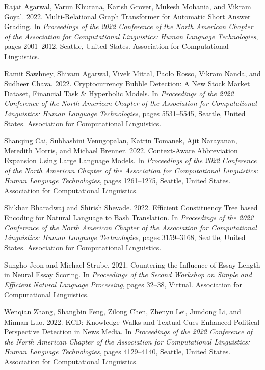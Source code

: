 \documentclass[11pt]{article}
\begin{document}
\begin{thebibliography}{50}
\bibitem{}
Rajat Agarwal, Varun Khurana, Karish Grover, Mukesh Mohania, and Vikram Goyal. 2022. Multi-Relational Graph Transformer for Automatic Short Answer Grading. In \emph{Proceedings of the 2022 Conference of the North American Chapter of the Association for Computational Linguistics: Human Language Technologies}, pages 2001–2012, Seattle, United States. Association for Computational Linguistics.

\bibitem{}
Ramit Sawhney, Shivam Agarwal, Vivek Mittal, Paolo Rosso, Vikram Nanda, and Sudheer Chava. 2022. Cryptocurrency Bubble Detection: A New Stock Market Dataset, Financial Task \& Hyperbolic Models. In \emph{Proceedings of the 2022 Conference of the North American Chapter of the Association for Computational Linguistics: Human Language Technologies}, pages 5531–5545, Seattle, United States. Association for Computational Linguistics.

\bibitem{}
Shanqing Cai, Subhashini Venugopalan, Katrin Tomanek, Ajit Narayanan, Meredith Morris, and Michael Brenner. 2022. Context-Aware Abbreviation Expansion Using Large Language Models. In \emph{Proceedings of the 2022 Conference of the North American Chapter of the Association for Computational Linguistics: Human Language Technologies}, pages 1261–1275, Seattle, United States. Association for Computational Linguistics.

\bibitem{}
Shikhar Bharadwaj and Shirish Shevade. 2022. Efficient Constituency Tree based Encoding for Natural Language to Bash Translation. In \emph{Proceedings of the 2022 Conference of the North American Chapter of the Association for Computational Linguistics: Human Language Technologies}, pages 3159–3168, Seattle, United States. Association for Computational Linguistics.

\bibitem{}
Sungho Jeon and Michael Strube. 2021. Countering the Influence of Essay Length in Neural Essay Scoring. In \emph{Proceedings of the Second Workshop on Simple and Efficient Natural Language Processing}, pages 32–38, Virtual. Association for Computational Linguistics.

\bibitem{}
Wenqian Zhang, Shangbin Feng, Zilong Chen, Zhenyu Lei, Jundong Li, and Minnan Luo. 2022. KCD: Knowledge Walks and Textual Cues Enhanced Political Perspective Detection in News Media. In \emph{Proceedings of the 2022 Conference of the North American Chapter of the Association for Computational Linguistics: Human Language Technologies}, pages 4129–4140, Seattle, United States. Association for Computational Linguistics.


\end{thebibliography}
\end{document}

